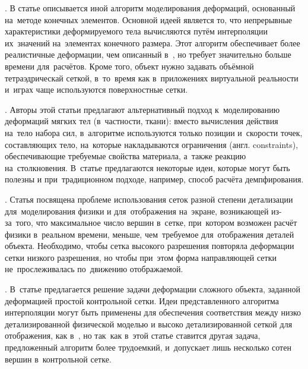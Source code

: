 \documentclass[a4paper,11pt]{report}
\begin{document}
    \cite[Stable Real-Time Deformations]{muller-stable}. В статье описывается иной алгоритм
      моделирования деформаций, основанный на~методе конечных элементов. Основной идеей является то,
      что непрерывные характеристики деформируемого тела вычисляются путём интерполяции их~значений
      на~элементах конечного размера. Этот алгоритм обеспечивает более реалистичные деформации, чем
      описанный в~\cite{muller-meshless}, но требует значительно больше времени для~расчётов. Кроме
      того, объект нужно задавать объёмной тетраэдрическай сеткой, в~то~время как в~приложениях
      виртуальной реальности и~играх чаще используются поверхностные сетки.

    \cite[Position Based Dynamics]{muller-position-dynamics}. Авторы этой статьи предлагают
      альтернативный подход к~моделированию деформаций мягких тел (в~частности, ткани): вместо
      вычисления действия на~тело набора сил, в~алгоритме используются только позиции и~скорости
      точек, составляющих тело, на~которые накладываются ограничения (англ. {\English constraints}),
      обеспечивающие требуемые свойства материала, а~также реакцию на~столкновения. В~статье
      предлагаются некоторые идеи, которые могут быть полезны и при~традиционном подходе, например,
      способ расчёта демпфирования.

    \cite[Deforming a High-Resolution Mesh...]{visser-mapping}. Статья посвящена проблеме
      использования сеток разной степени детализации для~моделирования физики и для~отображения
      на~экране, возникающей из-за~того, что максимальное число вершин в~сетке, при~котором возможен
      расчёт физики в~реальном времени, меньше, чем~требуемое для~отображения деталей объекта.
      Необходимо, чтобы сетка высокого разрешения повторяла деформации сетки низкого разрешения, но
      чтобы при~этом форма направляющей сетки не~прослеживалась по~движению отображаемой.

    \cite[Efficient Mesh Deformation Using Tetrahedron Control Mesh]{huang-control-mesh}.
      В~статье предлагается решение задачи деформации сложного объекта, заданной деформацией простой
      контрольной сетки. Идеи представленного алгоритма интерполяции могут быть применены для
      обеспечения соответствия между низко детализированной физической моделью и высоко детализированной
      сеткой для отображения, как в~\cite{visser-mapping}, но так~как в~этой статье ставится другая
      задача, предложенный алгоритм более трудоемкий, и~допускает лишь несколько сотен вершин
      в~контрольной сетке.
\end{document}
